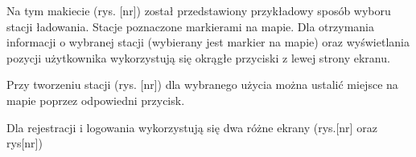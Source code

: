 Na tym makiecie (rys. [nr]) został przedstawiony przykładowy sposób wyboru stacji ładowania. Stacje poznaczone markierami na mapie. Dla otrzymania informacji o wybranej stacji (wybierany jest markier na mapie) oraz wyświetlania pozycji użytkownika wykorzystują się okrągłe przyciski z lewej strony ekranu.

Przy tworzeniu stacji (rys. [nr]) dla wybranego użycia można ustalić miejsce na mapie poprzez odpowiedni przycisk.

Dla rejestracji i logowania wykorzystują się dwa różne ekrany (rys.[nr] oraz rys[nr])








